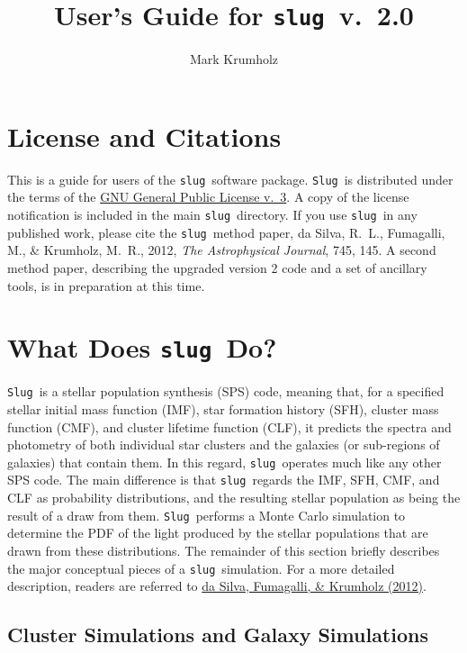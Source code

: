 \documentclass[12pt]{article}
\newcommand{\slug}{\texttt{slug}}
\newcommand{\Slug}{\texttt{Slug}}
\begin{document}
\title{User's Guide for \slug\ v.~2.0}
\author{Mark Krumholz}

\maketitle

\tableofcontents

\clearpage

\section{License and Citations}

This is a guide for users of the \slug\ software package. \Slug\ is distributed under the terms of the \href{http://www.gnu.org/licenses/gpl.html}{GNU General Public License v.~3}. A copy of the license notification is included in the main \slug\ directory. If you use \slug\ in any published work, please cite the \slug\ method paper, da Silva, R.~L., Fumagalli, M., \& Krumholz, M.~R., 2012, \textit{The Astrophysical Journal}, 745, 145. A second method paper, describing the upgraded version 2 code and a set of ancillary tools, is in preparation at this time.

\section{What Does \slug\ Do?}

\Slug\ is a stellar population synthesis (SPS) code, meaning that, for a specified stellar initial mass function (IMF), star formation history (SFH), cluster mass function (CMF), and cluster lifetime function (CLF), it predicts the spectra and photometry of both individual star clusters and the galaxies (or sub-regions of galaxies) that contain them. In this regard, \slug\ operates much like any other SPS code. The main difference is that \slug\ regards the IMF, SFH, CMF, and CLF as probability distributions, and the resulting stellar population as being the result of a draw from them. \Slug\ performs a Monte Carlo simulation to determine the PDF of the light produced by the stellar populations that are drawn from these distributions. The remainder of this section briefly describes the major conceptual pieces of a \slug\ simulation. For a more detailed description, readers are referred to \href{http://adsabs.harvard.edu/abs/2012ApJ...745..145D}{da Silva, Fumagalli, \& Krumholz (2012)}.

\subsection{Cluster Simulations and Galaxy Simulations}
\end{document}
